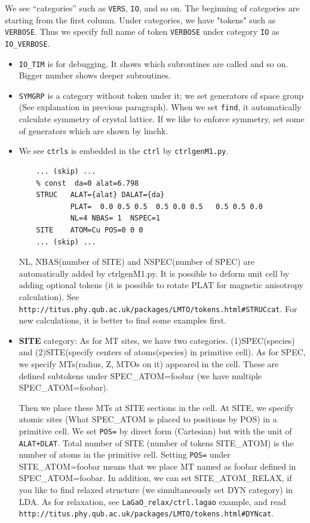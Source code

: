 {%
We see ``categories'' such as \verb+VERS+, \verb+IO+, and so on.
The beginning of categories are starting from the first column.
Under categories, we have "tokens" such as \verb+VERBOSE+.
Thus we specify full name of token \verb+VERBOSE+ under category
\verb+IO+ as \verb+IO_VERBOSE+.


\begin{itemize}
\item
\verb+IO_TIM+ is for debugging. It shows which subroutines are
called and so on. Bigger number shows deeper subroutines.

\item
\verb+SYMGRP+ is a category without token under it; 
we set generators of space group (See explanation in previous paragraph).
When we set \verb+find+, it automatically calculate symmetry of crystal lattice.
If we like to enforce symmetry, set some of generators which are shown by lmchk.


\item
We see \verb+ctrls+ is embedded in the \verb+ctrl+ by \verb+ctrlgenM1.py+.
\begin{verbatim}
    ... (skip) ...
    % const  da=0 alat=6.798
    STRUC   ALAT={alat} DALAT={da}
            PLAT=  0.0 0.5 0.5  0.5 0.0 0.5   0.5 0.5 0.0
            NL=4 NBAS= 1  NSPEC=1
    SITE    ATOM=Cu POS=0 0 0
    ... (skip) ...
\end{verbatim}
NL, NBAS(number of SITE) and NSPEC(number of SPEC) are automatically
added by ctrlgenM1.py.
It is possible to deform unit cell by adding optional tokens
(it is possible to rotate PLAT for magnetic anisotropy calculation).
See \verb+http://titus.phy.qub.ac.uk/packages/LMTO/tokens.html#STRUCcat+.
For new calculations, it is better to find some examples first.

\item
{\bf SITE} category:
As for MT sites, we have two categories.
(1)SPEC(species) and (2)SITE(specify centers of atoms(species) in primitive cell).
As for SPEC, we specify MTs(radius, Z, MTOs on it) appeared in the cell.
These are defined subtokens under SPEC\_ATOM=foobar (we have multiple SPEC\_ATOM=foobar).

Then we place these MTs at SITE sections in the cell.
At SITE, we specify atomic sites 
(What SPEC\_ATOM is placed to positions by POS) in a primitive cell.
We set \verb+POS=+ by direct form (Cartesian) but with the unit of \verb$ALAT+DLAT$.
Total number of SITE (number of tokens SITE\_ATOM) is
the number of atoms in the primitive cell.
Setting \verb+POS=+ under  SITE\_ATOM=foobar 
means that we place MT named as foobar defined in SPEC\_ATOM=foobar.
In addition, we can set SITE\_ATOM\_RELAX, if you like to find relaxed
structure (we simultaneously set DYN category) in LDA. As for
relaxation, see \verb+LaGaO_relax/ctrl.lagao+
example, and read\\ \verb+http://titus.phy.qub.ac.uk/packages/LMTO/tokens.html#DYNcat+.\\


\end{itemize}}

